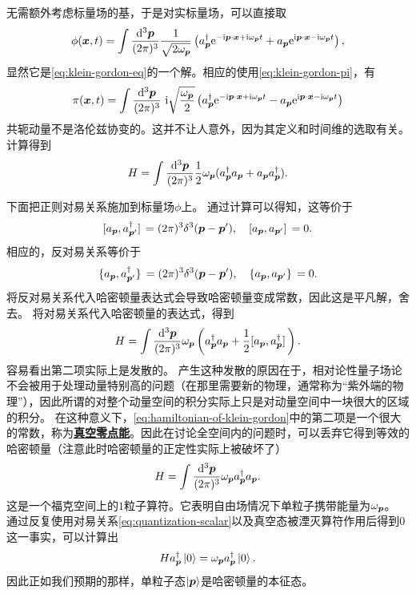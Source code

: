 \documentclass[hyperref, UTF8, a4paper]{ctexart}
\newcommand*{\ii}{\mathrm{i}}
\newcommand*{\ee}{\mathrm{e}}
\newcommand{\concept}[1]{\underline{\textbf{#1}}}
\begin{document}
无需额外考虑标量场的基，于是对实标量场，可以直接取
\begin{equation}
    {\phi}(\vb*{x}, t) = \int \frac{\dd[3]{\vb*{p}}}{(2\pi)^3} \frac{1}{\sqrt{2 \omega_{\vb*{p}}}} \left( {a}^\dagger_{\vb*{p}} \ee^{ - \ii \vb*{p} \cdot \vb*{x} + \ii \omega_{\vb*{p}} t} + {a}_{\vb*{p}} \ee^{ \ii \vb*{p} \cdot \vb*{x} - \ii \omega_{\vb*{p}} t} \right),
    \label{eq:expanding-klein-gordon-field}
\end{equation}
显然它是\eqref{eq:klein-gordon-eq}的一个解。相应的使用\eqref{eq:klein-gordon-pi}，有
\begin{equation}
    {\pi}(\vb*{x}, t) = \int \frac{\dd[3]{\vb*{p}}}{(2\pi)^3} \  \ii \sqrt{\frac{\omega_{\vb*{p}}}{2}} \left( {a}^\dagger_{\vb*{p}} \ee^{ - \ii \vb*{p} \cdot \vb*{x} + \ii \omega_{\vb*{p}} t} - {a}_{\vb*{p}} \ee^{ \ii \vb*{p} \cdot \vb*{x} - \ii \omega_{\vb*{p}} t} \right)
\end{equation}
共轭动量不是洛伦兹协变的。这并不让人意外，因为其定义和时间维的选取有关。
计算得到
\[
    {H} = \int \frac{\dd[3]{\vb*{p}}}{(2\pi)^3} \frac{1}{2} \omega_{\vb*{p}} ({a}_{\vb*{p}}^\dagger {a}_{\vb*{p}} + {a}_{\vb*{p}} {a}^\dagger_{\vb*{p}}).
\]

下面把正则对易关系施加到标量场${\phi}$上。
通过计算可以得知，这等价于
\begin{equation}
    \comm*{{a}_{\vb*{p}}}{{a}^\dagger_{\vb*{p}'}} = (2\pi)^3 \delta^3 (\vb*{p} - \vb*{p}'), \quad \comm*{{a}_{\vb*{p}}}{{a}_{\vb*{p}'}} = 0.
    \label{eq:quantization-scalar}
\end{equation}
相应的，反对易关系等价于
\[
    \acomm*{{a}_{\vb*{p}}}{{a}^\dagger_{\vb*{p}'}} = (2\pi)^3 \delta^3 (\vb*{p} - \vb*{p}'), \quad \acomm*{{a}_{\vb*{p}}}{{a}_{\vb*{p}'}} = 0.
\]
将反对易关系代入哈密顿量表达式会导致哈密顿量变成常数，因此这是平凡解，舍去。
将对易关系代入哈密顿量的表达式，得到
\begin{equation}
    {H} = \int \frac{\dd[3]{\vb*{p}}}{(2\pi)^3} \omega_{\vb*{p}} \left({a}_{\vb*{p}}^\dagger {a}_{\vb*{p}}  + \frac{1}{2} \comm*{{a}_{\vb*{p}}}{{a}^\dagger_{\vb*{p}}} \right).
    \label{eq:hamiltonian-of-klein-gordon}
\end{equation}
容易看出第二项实际上是发散的。
产生这种发散的原因在于，相对论性量子场论不会被用于处理动量特别高的问题（在那里需要新的物理，通常称为“紫外端的物理”），因此所谓的对整个动量空间的积分实际上只是对动量空间中一块很大的区域的积分。
在这种意义下，\eqref{eq:hamiltonian-of-klein-gordon}中的第二项是一个很大的常数，称为\concept{真空零点能}。因此在讨论全空间内的问题时，可以丢弃它得到等效的哈密顿量（注意此时哈密顿量的正定性实际上被破坏了）%
\begin{equation}
    {H} = \int \frac{\dd[3]{\vb*{p}}}{(2\pi)^3} \omega_{\vb*{p}} {a}_{\vb*{p}}^\dagger {a}_{\vb*{p}}.
\end{equation}
这是一个福克空间上的$1$粒子算符。它表明自由场情况下单粒子携带能量为$\omega_{\vb*{p}}$。
通过反复使用对易关系\eqref{eq:quantization-scalar}以及真空态被湮灭算符作用后得到$0$这一事实，可以计算出
\begin{equation}
    {H} {a}_{\vb*{p}}^\dagger \ket{0} = \omega_{\vb*{p}} {a}_{\vb*{p}}^\dagger \ket{0}.
\end{equation}
因此正如我们预期的那样，单粒子态$\ket{\vb*{p}}$是哈密顿量的本征态。
\end{document}
